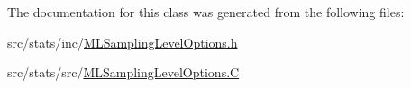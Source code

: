The documentation for this class was generated from the following files\-:\begin{DoxyCompactItemize}
\item 
src/stats/inc/\hyperlink{_m_l_sampling_level_options_8h}{M\-L\-Sampling\-Level\-Options.\-h}\item 
src/stats/src/\hyperlink{_m_l_sampling_level_options_8_c}{M\-L\-Sampling\-Level\-Options.\-C}\end{DoxyCompactItemize}
